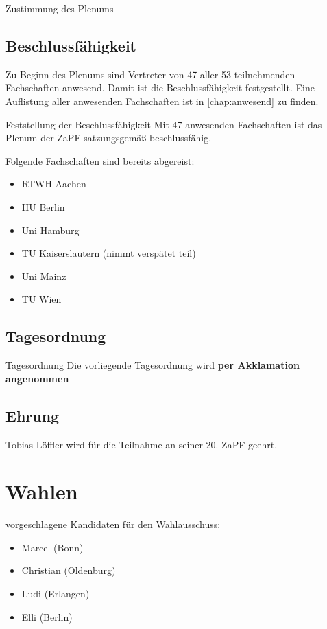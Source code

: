     \begin{success}{}
      Zustimmung des Plenums
    \end{success}

  \subsection{Beschlussfähigkeit}
    Zu Beginn des Plenums sind Vertreter von 47 aller 53 teilnehmenden Fachschaften anwesend. Damit ist die
    Beschlussfähigkeit festgestellt. Eine Auflistung aller anwesenden Fachschaften ist in \ref{chap:anwesend}
    zu finden. \\

    \begin{success}{Feststellung der Beschlussfähigkeit}
      Mit 47 anwesenden Fachschaften ist das Plenum der ZaPF satzungsgemäß beschlussfähig.
    \end{success}

    Folgende Fachschaften sind bereits abgereist:
    \begin{itemize}
      \item RTWH Aachen
      \item HU Berlin
      \item Uni Hamburg
      \item TU Kaiserslautern (nimmt verspätet teil)
      \item Uni Mainz
      \item TU Wien
    \end{itemize}

  \subsection{Tagesordnung}
    \begin{success}{Tagesordnung}
      Die vorliegende Tagesordnung wird \textbf{per Akklamation angenommen}
    \end{success}

  \subsection{Ehrung}
    Tobias Löffler wird für die Teilnahme an seiner 20. ZaPF geehrt.

\section{Wahlen}
    vorgeschlagene Kandidaten für den Wahlausschuss:
    \begin{itemize}
     \item Marcel (Bonn)
     \item Christian (Oldenburg)
     \item Ludi (Erlangen)
     \item Elli (Berlin)
    \end{itemize}

